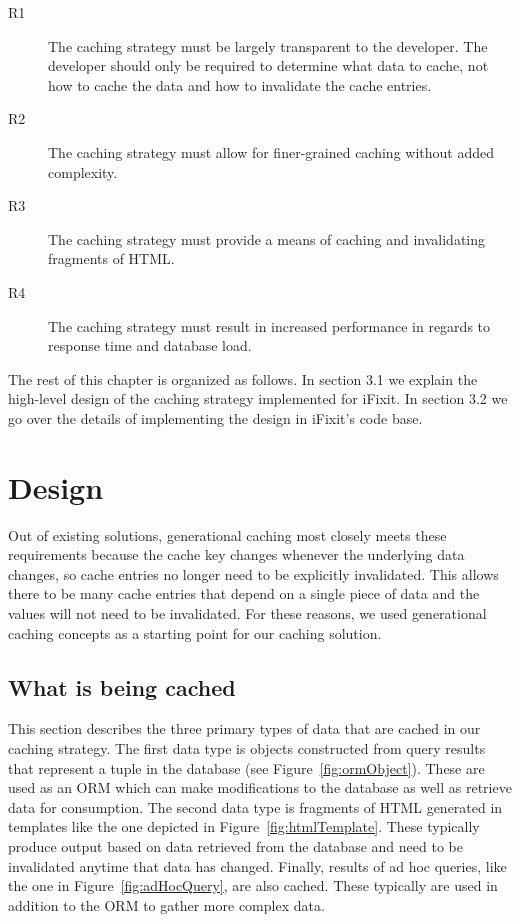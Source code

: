 \documentclass[12pt]{ucthesis}
\begin{document}
\begin{description}
   \item[R1] The caching strategy must be largely transparent to the developer.
             The developer should only be required to determine what data to cache, not how to cache the data and how to invalidate the cache entries.
   \item[R2] The caching strategy must allow for finer-grained caching without added complexity.
   \item[R3] The caching strategy must provide a means of caching and invalidating fragments of HTML.
   \item[R4] The caching strategy must result in increased performance in regards to response time and database load. %
\end{description}

The rest of this chapter is organized as follows.
In section 3.1 we explain the high-level design of the caching strategy implemented for \textsf{iFixit}.
In section 3.2 we go over the details of implementing the design in \textsf{iFixit}'s code base.

\section{Design}
Out of existing solutions, generational caching most closely meets these requirements because the cache key changes whenever the underlying data changes, so cache entries no longer need to be explicitly invalidated.
This allows there to be many cache entries that depend on a single piece of data and the values will not need to be invalidated.
For these reasons, we used generational caching concepts as a starting point for our caching solution.

\subsection{What is being cached}
This section describes the three primary types of data that are cached in our caching strategy.
The first data type is objects constructed from query results that represent a tuple in the database (see Figure~\ref{fig:ormObject}).
These are used as an ORM which can make modifications to the database as well as retrieve data for consumption.
The second data type is fragments of HTML generated in templates like the one depicted in Figure~\ref{fig:htmlTemplate}.
These typically produce output based on data retrieved from the database and need to be invalidated anytime that data has changed.
Finally, results of ad hoc queries, like the one in Figure~\ref{fig:adHocQuery}, are also cached.
These typically are used in addition to the ORM to gather more complex data.
\end{document}
